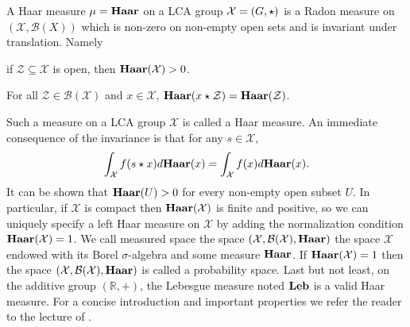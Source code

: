 \begin{definition}
A Haar measure $\mu=\mathbf{Haar}$ on a \acs{LCA} group $\mathcal{X}=(G,\star)$ is a Radon measure on $(\mathcal{X},\mathcal{B}(X))$ which is non-zero on non-empty open sets and is invariant under translation. Namely
\begin{propenum}
\item if $\mathcal{Z} \subseteq \mathcal{X}$ is open, then $\mathbf{Haar}(\mathcal{X})>0$.
\item For all $\mathcal{Z}\in\mathcal{B}(\mathcal{X})$ and $x \in \mathcal{X}$, $\mathbf{Haar}(x\star \mathcal{Z})=\mathbf{Haar}(\mathcal{Z})$.
\end{propenum}
\end{definition}
Such a measure on a \acs{LCA} group $\mathcal{X}$ is called a Haar measure. An immediate consequence of the invariance is that for any $s\in\mathcal{X}$,
\begin{dmath*}
\int_{\mathcal{X}}f(s\groupop x)d\Haar(x)=\int_{\mathcal{X}}f(x)d\Haar(x).
\end{dmath*}
It can be shown that $\mathbf{Haar}(U) > 0$ for every non-empty open subset $U$. In particular, if $\mathcal{X}$ is compact then $\mathbf{Haar}(\mathcal{X})$ is finite and positive, so we can uniquely specify a left Haar measure on $\mathcal{X}$ by adding the normalization condition $\mathbf{Haar}(\mathcal{X})=1$. We call measured space the space $(\mathcal{X},\mathcal{B}(\mathcal{X}),\mathbf{Haar})$ the space $\mathcal{X}$ endowed with its Borel $\sigma$-algebra and some measure $\mathbf{Haar}$. If $\mathbf{Haar}(\mathcal{X})=1$ then the space $(\mathcal{X},\mathcal{B}(\mathcal{X}),\mathbf{Haar})$ is called a probability space. Last but not least, on the additive group $(\mathbb{R},+)$, the Lebesgue measure noted $\mathbf{Leb}$ is a valid Haar measure. For a concise introduction and important properties we refer the reader to the lecture of \citet{tornier2014haar}.

